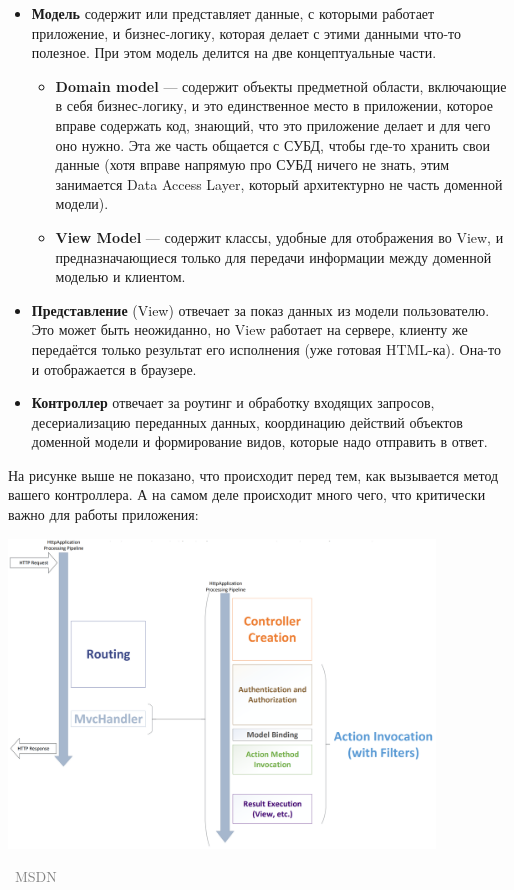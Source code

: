 \documentclass[a5paper]{article}
\newcommand{\attribution}[1] {
\vspace{-5mm}\begin{flushright}\begin{scriptsize}\textcolor{gray}{\textcopyright\, #1}\end{scriptsize}\end{flushright}
}
\begin{document}
\begin{itemize}
    \item \textbf{Модель} содержит или представляет данные, с которыми работает приложение, и бизнес-логику, которая делает с этими данными что-то полезное. При этом модель делится на две концептуальные части.
    \begin{itemize}
        \item \textbf{Domain model} --- содержит объекты предметной области, включающие в себя бизнес-логику, и это единственное место в приложении, которое вправе содержать код, знающий, что это приложение делает и для чего оно нужно. Эта же часть общается с СУБД, чтобы где-то хранить свои данные (хотя вправе напрямую про СУБД ничего не знать, этим занимается Data Access Layer, который архитектурно не часть доменной модели).
        \item \textbf{View Model} --- содержит классы, удобные для отображения во View, и предназначающиеся только для передачи информации между доменной моделью и клиентом.
    \end{itemize}
    \item \textbf{Представление} (View) отвечает за показ данных из модели пользователю. Это может быть неожиданно, но View работает на сервере, клиенту же передаётся только результат его исполнения (уже готовая HTML-ка). Она-то и отображается в браузере.
    \item \textbf{Контроллер} отвечает за роутинг и обработку входящих запросов, десериализацию переданных данных, координацию действий объектов доменной модели и формирование видов, которые надо отправить в ответ.
\end{itemize}

На рисунке выше не показано, что происходит перед тем, как вызывается метод вашего контроллера. А на самом деле происходит много чего, что критически важно для работы приложения:

\begin{center}
    \includegraphics[width=0.85\textwidth]{requestLifecycle.png}
    \attribution{MSDN}
\end{center}
\end{document}
